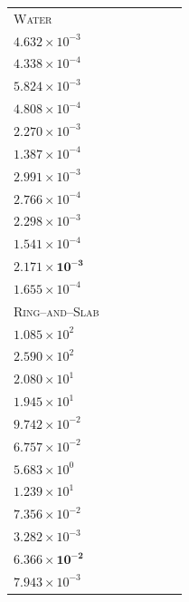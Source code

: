 \begin{table}[p]
{\begin{tabular}{lcccccc}
\textsc{Water} & \shortstack{$4.613\!\times\!10^{-3}$\\$4.632\!\times\!10^{-3}$\\$4.338\!\times\!10^{-4}$} & \shortstack{$5.941\!\times\!10^{-3}$\\$5.824\!\times\!10^{-3}$\\$4.808\!\times\!10^{-4}$} & \shortstack{$2.289\!\times\!10^{-3}$\\$2.270\!\times\!10^{-3}$\\$1.387\!\times\!10^{-4}$} & \shortstack{$2.940\!\times\!10^{-3}$\\$2.991\!\times\!10^{-3}$\\$2.766\!\times\!10^{-4}$} & \shortstack{$2.245\!\times\!10^{-3}$\\$2.298\!\times\!10^{-3}$\\$1.541\!\times\!10^{-4}$} & \shortstack{$\mathbf{2.139\!\times\!10^{-3}}$\\$\mathbf{2.171\!\times\!10^{-3}}$\\$1.655\!\times\!10^{-4}$} \\
\rowcolor{black!6}
\textsc{Ring--and--Slab} & \shortstack{$2.876\!\times\!10^{1}$\\$1.085\!\times\!10^{2}$\\$2.590\!\times\!10^{2}$} & \shortstack{$2.308\!\times\!10^{1}$\\$2.080\!\times\!10^{1}$\\$1.945\!\times\!10^{1}$} & \shortstack{$7.039\!\times\!10^{-2}$\\$9.742\!\times\!10^{-2}$\\$6.757\!\times\!10^{-2}$} & \shortstack{$4.163\!\times\!10^{-1}$\\$5.683\!\times\!10^{0}$\\$1.239\!\times\!10^{1}$} & \shortstack{$7.368\!\times\!10^{-2}$\\$7.356\!\times\!10^{-2}$\\$3.282\!\times\!10^{-3}$} & \shortstack{$\mathbf{5.980\!\times\!10^{-2}}$\\$\mathbf{6.366\!\times\!10^{-2}}$\\$7.943\!\times\!10^{-3}$} \\

\end{tabular}}
\end{table}
